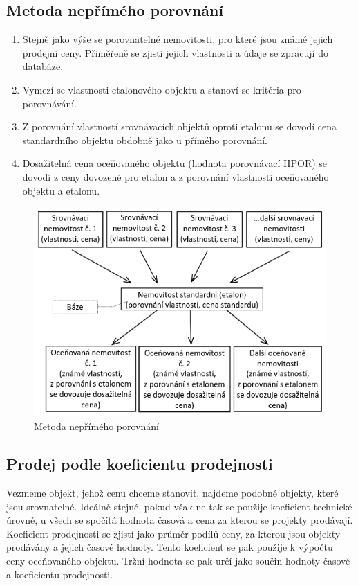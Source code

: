 \subsection{Metoda nepřímého porovnání}
\begin{enumerate}
    \item Stejně jako výše se porovnatelné nemovitosti, pro které jsou známé jejich
    prodejní ceny. Přiměřeně se zjistí jejich vlastnosti a údaje se zpracují do
    databáze.
    \item Vymezí se vlastnosti etalonového objektu a stanoví se kritéria pro
    porovnávání.
    \item Z porovnání vlastností srovnávacích objektů oproti etalonu se dovodí cena
    standardního objektu obdobně jako u přímého porovnání.
    \item Dosažitelná cena oceňovaného objektu (hodnota porovnávací HPOR) se
    dovodí z ceny dovozené pro etalon a z porovnání vlastností oceňovaného
    objektu a etalonu.
\end{enumerate}
\begin{figure}[h]
    \centering
    \includegraphics[scale=0.5]{images/porovnani2.png}
    \caption{Metoda nepřímého porovnání}
    \label{fig:porovnani2}
\end{figure}
\subsection{Prodej podle koeficientu prodejnosti}
Vezmeme objekt, jehož cenu chceme stanovit, najdeme podobné objekty, které jsou srovnatelné. Ideálně stejné, pokud však ne tak se použije koeficient
technické úrovně, u všech se spočítá hodnota časová a cena za kterou se projekty prodávají. Koeficient prodejnosti se zjistí jako průměr podílů ceny, za kterou
jsou objekty prodávány a jejich časové hodnoty. Tento koeficient se pak použije k výpočtu ceny oceňovaného objektu. Tržní hodnota se pak určí jako 
součin hodnoty časové a koeficientu prodejnosti.

